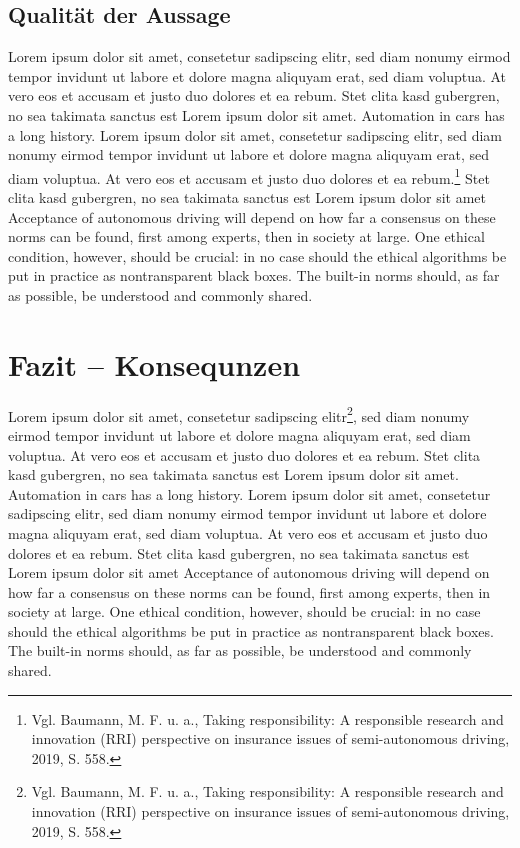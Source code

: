 \subsection{Qualität der Aussage}

Lorem ipsum dolor sit amet, consetetur sadipscing elitr, sed diam nonumy eirmod tempor invidunt ut labore et dolore magna aliquyam erat, sed diam voluptua. 
At vero eos et accusam et justo duo dolores et ea rebum. 
Stet clita kasd gubergren, no sea takimata sanctus est Lorem ipsum dolor sit amet. 
Automation in cars has a long history.  Lorem ipsum dolor sit amet, consetetur sadipscing elitr, sed diam nonumy eirmod tempor invidunt ut labore et dolore magna aliquyam erat, sed diam voluptua. 
At vero eos et accusam et justo duo dolores et ea rebum.\footnote{Vgl. Baumann, M. F. u. a., Taking responsibility: A responsible research and innovation (RRI) perspective on insurance issues of semi-autonomous driving, 2019, S. 558.}
Stet clita kasd gubergren, no sea takimata sanctus est Lorem ipsum dolor sit amet Acceptance of autonomous driving will depend on how far a consensus on these norms can be found, first among experts, then in society at large. 
One ethical condition, however, should be crucial: in no case should the ethical algorithms be put in practice as nontransparent black boxes. 
The built-in norms should, as far as possible, be understood and commonly shared.

\section{Fazit – Konsequnzen}

Lorem ipsum dolor sit amet, consetetur sadipscing elitr\footnote{Vgl. Baumann, M. F. u. a., Taking responsibility: A responsible research and innovation (RRI) perspective on insurance issues of semi-autonomous driving, 2019, S. 558.}, sed diam nonumy eirmod tempor invidunt ut labore et dolore magna aliquyam erat, sed diam voluptua. 
At vero eos et accusam et justo duo dolores et ea rebum. 
Stet clita kasd gubergren, no sea takimata sanctus est Lorem ipsum dolor sit amet. 
Automation in cars has a long history.  Lorem ipsum dolor sit amet, consetetur sadipscing elitr, sed diam nonumy eirmod tempor invidunt ut labore et dolore magna aliquyam erat, sed diam voluptua. 
At vero eos et accusam et justo duo dolores et ea rebum. 
Stet clita kasd gubergren, no sea takimata sanctus est Lorem ipsum dolor sit amet Acceptance of autonomous driving will depend on how far a consensus on these norms can be found, first among experts, then in society at large. 
One ethical condition, however, should be crucial: in no case should the ethical algorithms be put in practice as nontransparent black boxes. 
The built-in norms should, as far as possible, be understood and commonly shared.